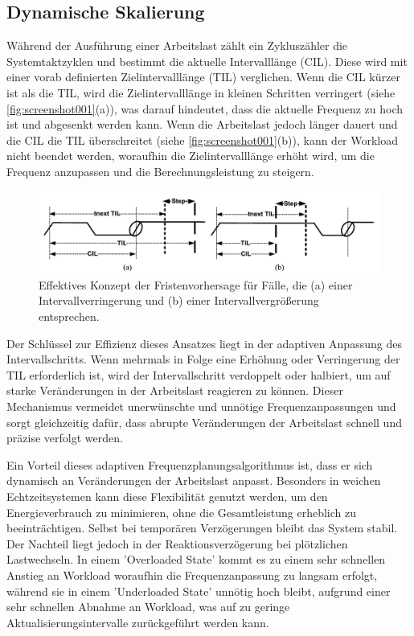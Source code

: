 \documentclass[footmark=none]{tubaf-thesis}
\begin{document}
    		\subsection{Dynamische Skalierung}
    		\label{chap:Frequenzskalierung}
    		Während der Ausführung einer Arbeitslast zählt ein Zykluszähler die Systemtaktzyklen und bestimmt die aktuelle Intervalllänge (CIL). Diese wird mit einer vorab definierten Zielintervalllänge (TIL) verglichen. Wenn die CIL kürzer ist als die TIL, wird die Zielintervalllänge in kleinen Schritten verringert (siehe \autoref{fig:screenshot001}(a)), was darauf hindeutet, dass die aktuelle Frequenz zu hoch ist und abgesenkt werden kann. Wenn die Arbeitslast jedoch länger dauert und die CIL die TIL überschreitet (siehe \autoref{fig:screenshot001}(b)), kann der Workload nicht beendet werden, woraufhin die Zielintervalllänge erhöht wird, um die Frequenz anzupassen und die Berechnungsleistung zu steigern. \cite{5545490}
    		
    		\begin{figure}[!ht]
    			\centering
    			\includegraphics[width=0.9\linewidth]{img/screenshot001}
    			\caption{Effektives Konzept der Fristenvorhersage für Fälle, die (a) einer Intervallverringerung und (b) einer Intervallvergrößerung entsprechen. \cite{5545490}}
    			\label{fig:screenshot001}
    		\end{figure}
    		
    		Der Schlüssel zur Effizienz dieses Ansatzes liegt in der adaptiven Anpassung des Intervallschritts. Wenn mehrmals in Folge eine Erhöhung oder Verringerung der TIL erforderlich ist, wird der Intervallschritt verdoppelt oder halbiert, um auf starke Veränderungen in der Arbeitslast reagieren zu können. Dieser Mechanismus vermeidet unerwünschte und unnötige Frequenzanpassungen und sorgt gleichzeitig dafür, dass abrupte Veränderungen der Arbeitslast schnell und präzise verfolgt werden. \cite{5545490}
    		
    		Ein Vorteil dieses adaptiven Frequenzplanungsalgorithmus ist, dass er sich dynamisch an Veränderungen der Arbeitslast anpasst. Besonders in weichen Echtzeitsystemen kann diese Flexibilität genutzt werden, um den Energieverbrauch zu minimieren, ohne die Gesamtleistung erheblich zu beeinträchtigen. Selbst bei temporären Verzögerungen bleibt das System stabil. Der Nachteil liegt jedoch in der Reaktionsverzögerung bei plötzlichen Lastwechseln. In einem 'Overloaded State' kommt es zu einem sehr schnellen Anstieg an Workload woraufhin die Frequenzanpassung zu langsam erfolgt, während sie in einem 'Underloaded State' unnötig hoch bleibt, aufgrund einer sehr schnellen Abnahme an Workload, was auf zu geringe Aktualisierungsintervalle zurückgeführt werden kann. \cite{4110118} \cite{5545490}
\end{document}
